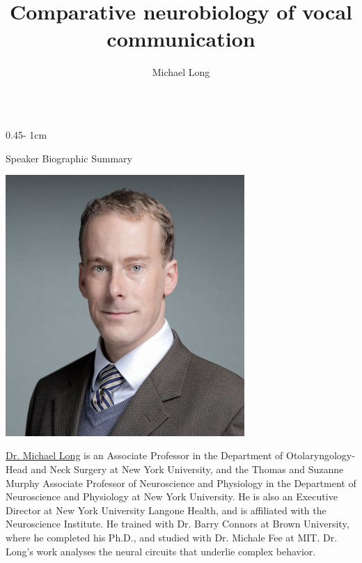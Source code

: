 \documentclass{../psuposter}
\title{Comparative neurobiology of vocal communication}
\author{Michael Long}
\institute{School of Medicine, New York University}
\begin{document}
\begin{frame}
\begin{columns}[t, totalwidth=\textwidth]
\begin{column}{0.45\textwidth - 1cm}


    \begin{block}{Speaker Biographic Summary}
    	\begin{center}
    		\includegraphics[width=0.68\textwidth]{images/long}
    	\end{center}
    	\href{https://med.nyu.edu/faculty/michael-a-long}{Dr. Michael Long} is
    	an Associate Professor in the Department of Otolaryngology-Head and Neck Surgery at New York University, and the Thomas and Suzanne Murphy Associate Professor of Neuroscience and Physiology in the Department of Neuroscience and Physiology at New York University. He is also an  Executive Director at New York University Langone Health, and is affiliated with the Neuroscience Institute. He trained with Dr. Barry Connors at Brown University, where he completed his Ph.D., and studied with Dr. Michale Fee at MIT. Dr. Long's work analyses the neural circuits that underlie complex behavior. 
    \end{block}



\end{column}
\end{columns}
\end{frame}
\end{document}
